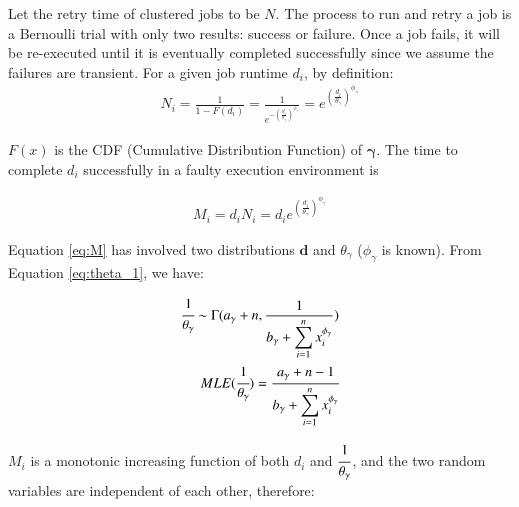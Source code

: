 
Let the retry time of clustered jobs to be $N$. The process to run and retry a job is a Bernoulli trial with only two results: success or failure. Once a job fails, it will be re-executed until it is eventually completed successfully since we assume the failures are transient. For a given job runtime $d_i$, by definition:
\begin{eqnarray}
\displaystyle
N_i=\frac{1}{1-F(d_i)}=\frac{1}{e^{-(\displaystyle\frac{d_i}{\theta_{\gamma}})^{\phi_{\gamma}}}}=e^{(\displaystyle\frac{d_i}{\theta_{\gamma}})^{\phi_{\gamma}}} 
\label{eq:N_i}
\end{eqnarray}

$F(x)$ is the CDF (Cumulative Distribution Function) of $\bm\gamma$. The time to complete $d_i$ successfully in a faulty execution environment is

\begin{eqnarray}
\displaystyle
M_i=d_iN_i=d_ie^{(\displaystyle\frac{d_i}{\theta_{\gamma}})^{\phi_{\gamma}}} 
\label{eq:M}
\end{eqnarray}

Equation \ref{eq:M} has involved two distributions $\bm d$ and $\theta_{\gamma}$ ($\phi_{\gamma}$ is known). From Equation \ref{eq:theta_1}, we have:

\begin{eqnarray}
\displaystyle\cfrac{1}{\theta_{\gamma}}\sim\Gamma(a_{\gamma}+n,\frac{1}{\displaystyle b_{\gamma}+\sum_{i=1}^n{x_i^{\phi_{\gamma}}}}) \\
MLE(\displaystyle\cfrac{1}{\theta_{\gamma}})=\displaystyle\cfrac{a_{\gamma}+n-1}{\displaystyle b_{\gamma}+\sum_{i=1}^n{x_i^{\phi_{\gamma}}}}
 \end{eqnarray}

$M_i$ is a monotonic increasing function of both $d_i$ and $\displaystyle\cfrac{1}{\theta_{\gamma}}$, and the two random variables are independent of each other, therefore:


